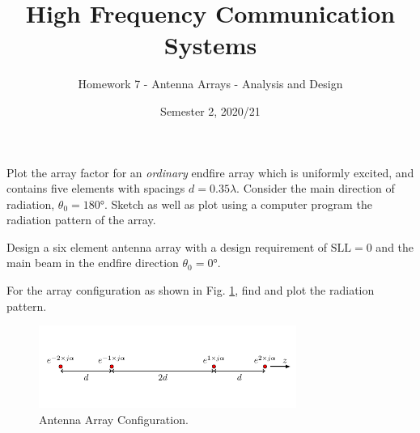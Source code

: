 \documentclass[addpoints]{exam}
\title{High Frequency Communication Systems}
\author{Homework 7 - Antenna Arrays - Analysis and Design}
\date{Semester 2, 2020/21}
\begin{document}
\maketitle


\begin{questions}
    \pointsinrightmargin 
    \bracketedpoints

\question[5] Plot the array factor for an \textit{ordinary} endfire array which is uniformly excited, and contains five elements with spacings $d = 0.35 \lambda$. Consider the main direction of radiation, $\theta_0 = \ang{180}$. Sketch as well as plot using a computer program the radiation pattern of the array. 

\question Design a six element antenna array with a design requirement of $\text{SLL} = 0$ and the main beam in the endfire direction $\theta_0 = \ang{0}$. 


\question[5]

For the array configuration as shown in Fig. \ref{fig:arrays}, find and plot the radiation pattern. 

\begin{figure}[htbp]
    \centering
    \includegraphics[width=0.75\textwidth]{5_elements.pdf}
    \caption{Antenna Array Configuration.}
    \label{fig:arrays}
\end{figure}
\end{questions}
\end{document}
